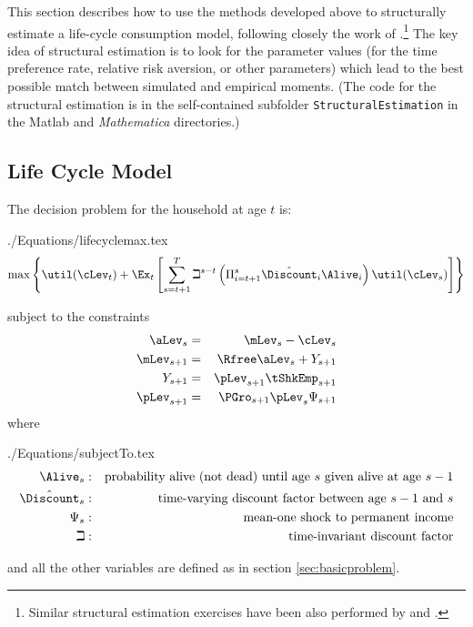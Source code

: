 \documentclass[titlepage]{\econtex}
\newcommand{\Mma}{\textit{Mathematica}}
\begin{document}
  This section describes how to use the methods developed above to
  structurally estimate a life-cycle consumption model, following
  closely the work of
  \cite{cagettiWprofiles}.\footnote{Similar structural
    estimation exercises have been also performed by
    \cite{palumbo:medical} and \cite{gpLifecycle}.} The key idea of
  structural estimation is to look for the parameter values (for the
  time preference rate, relative risk aversion, or other parameters)
  which lead to the best possible match between simulated and empirical
  moments.  (The code for the structural estimation is in the self-contained
  subfolder \texttt{StructuralEstimation} in the Matlab and {\Mma} directories.)

  \hypertarget{LifeCycleModel}{}
  \subsection{Life Cycle Model}

  The decision problem for the household at age $t$ is:
  \begin{verbatimwrite}{./Equations/lifecyclemax.tex}
    \begin{equation}
      \max \left\{ \util(\cLev_{t})+\Ex_{t}\left[\sum_{s=t+1}^{T} {\beth}^{s-t}\left( \Pi _{i=t+1}^{s}\hat{\Discount}_{i} \Alive _{i}\right) \util(\cLev_{s}) \right]\right\}   \label{eq:lifecyclemax}
    \end{equation}
  \end{verbatimwrite}
  
  subject to the constraints
  \begin{eqnarray*}
    \aLev_{s} &=&\mLev_{s}-\cLev_{s}
    \\      \mLev_{s+1} &=&\Rfree \aLev_{s}+Y_{s+1}
    \\      Y_{s+1} &=&\pLev_{s+1}\tShkEmp _{s+1}
    \\      \pLev_{s+1} &=&\PGro_{s+1}\pLev_{s}\Psi_{s+1}
  \end{eqnarray*}
  where
  \begin{verbatimwrite}{./Equations/subjectTo.tex}
    \begin{eqnarray*}
      \Alive _{s} &:&\text{probability alive (not dead) until age $s$ given alive at age $s-1$}
      \\      {\hat{\Discount}}_{s} &:&\text{time-varying discount factor between age $s-1$ and $s$}
      \\     \Psi_{s} &:&\text{mean-one shock to permanent income}
      \\     \beth &:&\text{time-invariant discount factor}
    \end{eqnarray*}
  \end{verbatimwrite}
  
  and all the other variables are defined as in section \ref{sec:basicproblem}.
\end{document}
